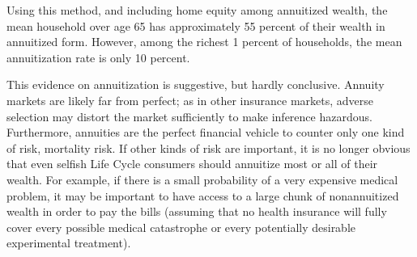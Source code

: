 \documentclass[titlepage,12pt]{article}
\begin{document}
Using this method, and including home equity among annuitized wealth, 
the mean household over age 65 has approximately 55 percent of their 
wealth in annuitized form.  However, among the richest 1 percent of 
households, the mean annuitization rate is only 10 percent.  

This evidence on annuitization is suggestive, but hardly conclusive.  
Annuity markets are likely far from perfect; as in other insurance 
markets, adverse selection may distort the market sufficiently to make 
inference hazardous.  Furthermore, annuities are the perfect financial 
vehicle to counter only one kind of risk, mortality risk.  If other 
kinds of risk are important, it is no longer obvious that even selfish 
Life Cycle consumers should annuitize most or all of their wealth.  
For example, if there is a small probability of a very expensive 
medical problem, it may be important to have access to a large chunk 
of nonannuitized wealth in order to pay the bills (assuming that no 
health insurance will fully cover every possible medical catastrophe 
or every potentially desirable experimental treatment).
\end{document}
